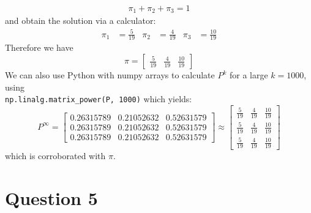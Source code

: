 \documentclass[12pt]{article}
\begin{document}
\begin{align}
    \pi_1 + \pi_2 + \pi_3 = 1
\end{align} and obtain the solution via a calculator: \begin{align*}
    \pi_1 &= \frac{5}{19} & \pi_2 &= \frac{4}{19} & \pi_3 &= \frac{10}{19}
\end{align*} Therefore we have \begin{equation}
    \pi = \begin{bmatrix}
        \displaystyle\frac{5}{19} & \displaystyle\frac{4}{19} & \displaystyle\frac{10}{19}
    \end{bmatrix}
\end{equation} We can also use Python with numpy arrays to calculate $P^{k}$ for a large $k = 1000$, using \\ \texttt{np.linalg.matrix\_power(P, 1000)} which yields: \begin{equation}
    P^{\infty} = \begin{bmatrix}
        0.26315789& 0.21052632& 0.52631579 \\ 
        0.26315789& 0.21052632& 0.52631579 \\ 
        0.26315789& 0.21052632& 0.52631579 
    \end{bmatrix} \approx \begin{bmatrix}
        \frac{5}{19} & \frac{4}{19} & \frac{10}{19} \\ 
        \frac{5}{19} & \frac{4}{19} & \frac{10}{19} \\ 
        \frac{5}{19} & \frac{4}{19} & \frac{10}{19} 
    \end{bmatrix}
\end{equation} which is corroborated with $\pi$. 

\section*{Question 5}
\end{document}
